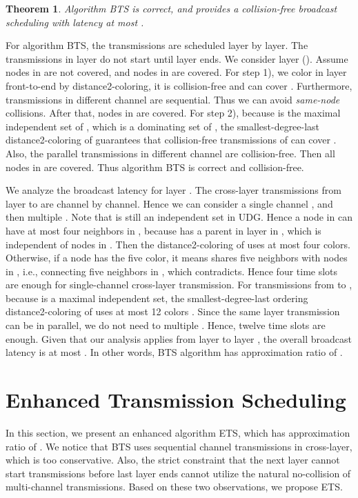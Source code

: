 \documentclass[10pt, conference]{IEEEtran}
\newtheorem{theorem}{Theorem}
\begin{document}
\begin{theorem} \label{BTS}
Algorithm BTS is correct, and provides a collision-free
broadcast scheduling with latency at most .
\end{theorem}
\begin{IEEEproof}
For algorithm BTS, the transmissions are scheduled layer by
layer. The transmissions in layer  do not start until
layer  ends. We consider layer  ().
Assume nodes in  are not covered, and nodes in 
are covered.  For step 1), we color  in layer 
front-to-end by distance2-coloring, it is collision-free and
can cover . Furthermore, transmissions in different
channel are sequential. Thus we can avoid \emph{same-node}
collisions. After that, nodes in  are covered. For
step 2), because  is the maximal independent set of
, which is a dominating set of , the
smallest-degree-last distance2-coloring of  guarantees
that collision-free transmissions of  can cover
. Also, the parallel transmissions in different
channel are collision-free. Then all nodes in  are
covered. Thus algorithm BTS is correct and collision-free.




We analyze the broadcast latency for layer .
The cross-layer transmissions from layer  to  are channel by channel. Hence we
can consider a single channel , and then multiple . Note that
 is still an independent set in UDG. Hence a node  in
 can have at most four neighbors in ,
because  has a parent in layer  in , which is independent of nodes in .
Then the distance2-coloring of  uses at most four
colors. Otherwise, if a node  has the five
color, it means  shares five neighbors with nodes in
, i.e., connecting five neighbors
in , which contradicts. Hence four time slots are
enough for single-channel cross-layer transmission. For
transmissions from  to , because 
is a maximal independent set, the smallest-degree-last ordering
distance2-coloring of  uses at most 12 colors
\cite{info07, smallest-degree}. Since the same layer
transmission can be in parallel, we do not need to multiple
. Hence, twelve time slots are enough. Given that our
analysis applies from layer  to layer , the overall
broadcast latency is at most . In other words, BTS
algorithm has approximation ratio of .
\end{IEEEproof}

\section{Enhanced Transmission Scheduling} \label{ets}
In this section, we present an enhanced algorithm ETS, which
has approximation ratio of . We notice that BTS uses
sequential channel transmissions in cross-layer, which is too
conservative. Also, the strict constraint that the next layer
cannot start transmissions before last layer ends cannot
utilize the natural no-collision of multi-channel
transmissions. Based on these two observations, we propose ETS.
\end{document}
